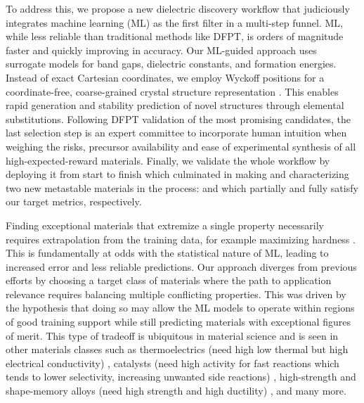 \documentclass{article}
\newcommand{\CsTaTeO}[1][]{\ch{CsTaTeO6#1}}
\newcommand{\BiZrO}[1][]{\ch{Bi2Zr2O7#1}}
\begin{document}
To address this, we propose a new dielectric discovery workflow that judiciously integrates machine learning (ML) as the first filter in a multi-step funnel.
ML, while less reliable than traditional methods like DFPT, is orders of magnitude faster and quickly improving in accuracy.
Our ML-guided approach uses surrogate models for band gaps, dielectric constants, and formation energies.
Instead of exact Cartesian coordinates, we employ Wyckoff positions for a coordinate-free, coarse-grained crystal structure representation \cite{goodall_rapid_2022}.
This enables rapid generation and stability prediction of novel structures through elemental substitutions.
Following DFPT validation of the most promising candidates, the last selection step is an expert committee to incorporate human intuition when weighing the risks, precursor availability and ease of experimental synthesis of all high-expected-reward materials.
Finally, we validate the whole workflow by deploying it from start to finish which culminated in making and characterizing two new metastable materials in the process: \CsTaTeO{} and \BiZrO{} which partially and fully satisfy our target metrics, respectively.

Finding exceptional materials that extremize a single property necessarily requires extrapolation from the training data, for example maximizing hardness \cite{zhang_finding_2021, zuo_accelerating_2021, schmidt_machinelearningassisted_2023}.
This is fundamentally at odds with the statistical nature of ML, leading to increased error and less reliable predictions.
Our approach diverges from previous efforts by choosing a target class of materials where the path to application relevance requires balancing multiple conflicting properties.
This was driven by the hypothesis that doing so may allow the ML models to operate within regions of good training support while still predicting materials with exceptional figures of merit.
This type of tradeoff is ubiquitous in material science and is seen in other materials classes such as thermoelectrics (need high low thermal but high electrical conductivity) \cite{gaultois_perspective_2016,yan_material_2015}, catalysts (need high activity for fast reactions which tends to lower selectivity, increasing unwanted side reactions) \cite{guan_bimetallic_2021,liutkova_ca_2023}, high-strength and shape-memory alloys (need high strength and high ductility) \cite{chiu_investigations_2022,li_effect_2021}, and many more.
\end{document}
